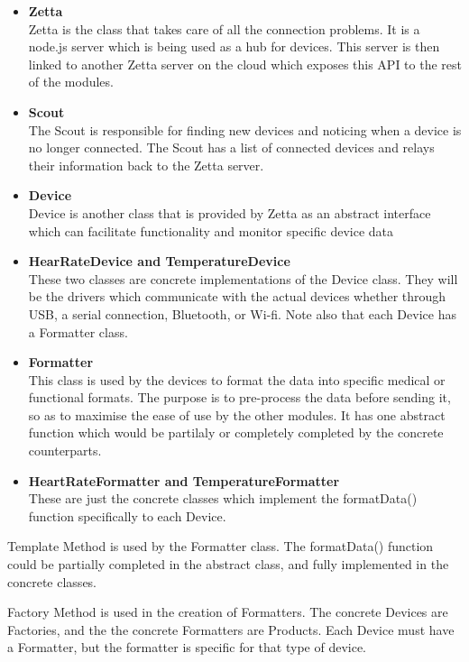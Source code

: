 \begin{itemize}
	\item \textbf{Zetta}\\
	Zetta is the class that takes care of all the connection problems. It is a node.js server which is being used as a hub for devices. This server is then linked to another Zetta server on the cloud which exposes this API to the rest of the modules.

	\item \textbf{Scout}\\
	The Scout is responsible for finding new devices and noticing when a device is no longer connected. The Scout has a list of connected devices and relays their information back to the Zetta server.

	\item \textbf{Device}\\
	Device is another class that is provided by Zetta as an abstract interface which can facilitate functionality and monitor specific device data

	\item \textbf{HearRateDevice and TemperatureDevice}\\
	These two classes are concrete implementations of the Device class. They will be the drivers which communicate with the actual devices whether through USB, a serial connection, Bluetooth, or Wi-fi. Note also that each Device has a Formatter class.

	\item \textbf{Formatter}\\
	This class is used by the devices to format the data into specific medical or functional formats. The purpose is to pre-process the data before sending it, so as to maximise the ease of use by the other modules. It has one abstract function which would be partilaly or completely completed by the concrete counterparts.

	\item \textbf{HeartRateFormatter and TemperatureFormatter}\\
	These are just the concrete classes which implement the formatData() function specifically to each Device.
\end{itemize}
Template Method is used by the Formatter class. The formatData() function could be partially completed in the abstract class, and fully implemented in the concrete classes.

Factory Method is used in the creation of Formatters. The concrete Devices are Factories, and the the concrete Formatters are Products. Each Device must have a Formatter, but the formatter is specific for that type of device.